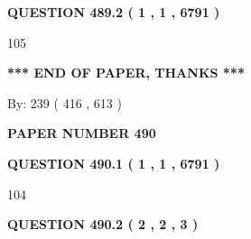 \documentclass[12pt]{article}
\begin{document}
 
 
 
  
\vspace{0.2in}
  
{\textbf{\Large{QUESTION
489.2 
 ( 1 , 1 , 6791 )
}}}
  
  
 
 
\noindent{}

105
 
 
   
   
 \vspace{0.2in}
 
   
   
   
   
\vspace{1.0in} 
{\textbf{\large{ *** END OF PAPER, THANKS *** }}} 
   
   
\hspace{1.0in} By: 
 239 ( 416 ,  613 )
   
   
   
   
\newpage 
\setcounter{page}{ 
   490001 } 
   
   
   
   
 {\textbf{ \Large{ PAPER NUMBER  490  }}}
   
   
\vspace{0.2in}
   
   
   
   
   
   
 \vspace{0.2in}
 
 
 
 
   
   
  
\vspace{0.2in}
  
{\textbf{\Large{QUESTION
490.1 
 ( 1 , 1 , 6791 )
}}}
  
  
 
 
\noindent{}

104
 
 
  
\vspace{0.2in}
  
{\textbf{\Large{QUESTION
490.2 
 ( 2 , 2 , 3 )
}}}
  
  
 
 
\noindent{}
 
\end{document}
